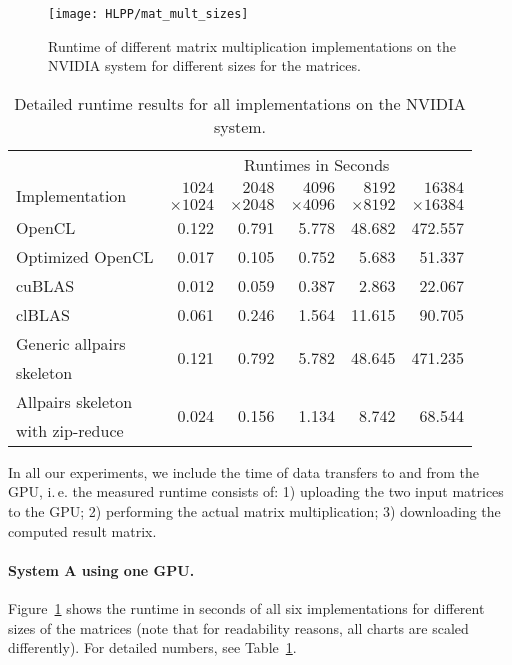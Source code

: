 \begin{figure}[b]
  \centering
  \texttt{[image: HLPP/mat\_mult\_sizes]}
  \caption{Runtime of different matrix multiplication implementations on the NVIDIA system for different sizes for the matrices.}
  \label{fig:mat_mult_single}
\end{figure}
\begin{table}[b]
  \centering
  \begin{tabular}{lrrrrr}
    \toprule
              & \multicolumn{5}{c}{Runtimes in Seconds} \\
    \cmidrule(r){2-6}
    \multirow{2}{*}{Implementation} & $1024$ & $2048$ & $4096$ & $8192$ & $16384$ \\
                                    & $\times 1024$ & $\times 2048$ & $\times 4096$ & $\times 8192$ & $\times 16384$\\
    \midrule
    OpenCL            & 0.122 & 0.791 & 5.778 & 48.682 & 472.557 \\
    Optimized OpenCL  & 0.017 & 0.105 & 0.752 &  5.683 &  51.337 \\
    cuBLAS            & 0.012 & 0.059 & 0.387 &  2.863 &  22.067 \\
    clBLAS            & 0.061 & 0.246 & 1.564 & 11.615 &  90.705 \\
    Generic allpairs  & \multirow{2}{*}{0.121} & \multirow{2}{*}{0.792} & \multirow{2}{*}{5.782} & \multirow{2}{*}{48.645} & \multirow{2}{*}{471.235} \\
    skeleton\\
    Allpairs skeleton & \multirow{2}{*}{0.024} & \multirow{2}{*}{0.156} & \multirow{2}{*}{1.134} & \multirow{2}{*}{8.742} & \multirow{2}{*}{68.544} \\
    with zip-reduce\\
    \bottomrule
  \end{tabular}
  \caption{Detailed runtime results for all implementations on the NVIDIA system.}
  \label{tab:mat_mult_single}
\end{table}

In all our experiments, we include the time of data transfers to and from the GPU, i.\,e. the measured runtime consists of:
1) uploading the two input matrices to the GPU;
2) performing the actual matrix multiplication;
3) downloading the computed result matrix.

\paragraph{System A using one GPU.}
Figure~\ref{fig:mat_mult_single} shows the runtime in seconds of all six implementations for different sizes of the matrices (note that for readability reasons, all charts are scaled differently).
For detailed numbers, see Table~\ref{tab:mat_mult_single}.

